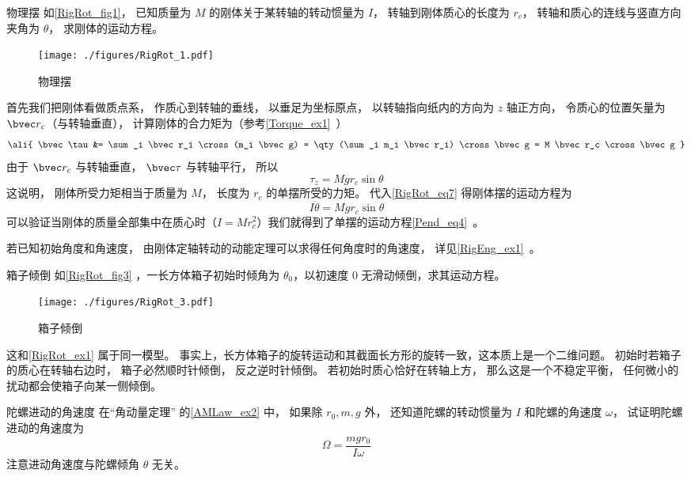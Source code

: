 \begin{example}{物理摆}\label{RigRot_ex1}
如\autoref{RigRot_fig1}， 已知质量为 $M$ 的刚体关于某转轴的转动惯量为 $I$， 转轴到刚体质心的长度为 $r_c$， 转轴和质心的连线与竖直方向夹角为 $\theta$， 求刚体的运动方程。
\begin{figure}[ht]
\centering
\texttt{[image: ./figures/RigRot\_1.pdf]}
\caption{物理摆} \label{RigRot_fig1}
\end{figure}

首先我们把刚体看做质点系， 作质心到转轴的垂线， 以垂足为坐标原点， 以转轴指向纸内的方向为 $z$ 轴正方向， 令质心的位置矢量为 $\bvec r_c$（与转轴垂直）， 计算刚体的合力矩为（参考\autoref{Torque_ex1}~）
\begin{equation}\label{RigRot_eq14}\ali{
\bvec \tau &= \sum_i \bvec r_i \cross (m_i \bvec g)
= \qty(\sum_i m_i \bvec r_i) \cross \bvec g
= M \bvec r_c \cross \bvec g
}\end{equation}
由于 $\bvec r_c$ 与转轴垂直， $\bvec \tau$ 与转轴平行， 所以
\begin{equation}
\tau_z = Mg r_c \sin\theta
\end{equation}
这说明， 刚体所受力矩相当于质量为 $M$， 长度为 $r_c$ 的单摆所受的力矩。 代入\autoref{RigRot_eq7} 得刚体摆的运动方程为
\begin{equation}
I\ddot \theta = Mg r_c \sin\theta
\end{equation}
可以验证当刚体的质量全部集中在质心时（$I = Mr_c^2$）我们就得到了单摆的运动方程\autoref{Pend_eq4}~。

若已知初始角度和角速度， 由刚体定轴转动的动能定理可以求得任何角度时的角速度， 详见\autoref{RigEng_ex1}~。
\end{example}

\begin{example}{箱子倾倒}
如\autoref{RigRot_fig3} ，一长方体箱子初始时倾角为 $\theta_0$，以初速度 0 无滑动倾倒，求其运动方程。
\begin{figure}[ht]
\centering
\texttt{[image: ./figures/RigRot\_3.pdf]}
\caption{箱子倾倒} \label{RigRot_fig3}
\end{figure}
这和\autoref{RigRot_ex1} 属于同一模型。 事实上，长方体箱子的旋转运动和其截面长方形的旋转一致，这本质上是一个二维问题。 初始时若箱子的质心在转轴右边时， 箱子必然顺时针倾倒， 反之逆时针倾倒。 若初始时质心恰好在转轴上方， 那么这是一个不稳定平衡， 任何微小的扰动都会使箱子向某一侧倾倒。
\end{example}

\begin{exercise}{陀螺进动的角速度}\label{RigRot_exe1}
在“角动量定理” 的\autoref{AMLaw_ex2} 中， 如果除 $r_0, m, g$ 外， 还知道陀螺的转动惯量为 $I$ 和陀螺的角速度 $\omega$， 试证明陀螺进动的角速度为
\begin{equation}
\Omega = \frac{mgr_0}{I\omega}
\end{equation}
注意进动角速度与陀螺倾角 $\theta$ 无关。
\end{exercise}

